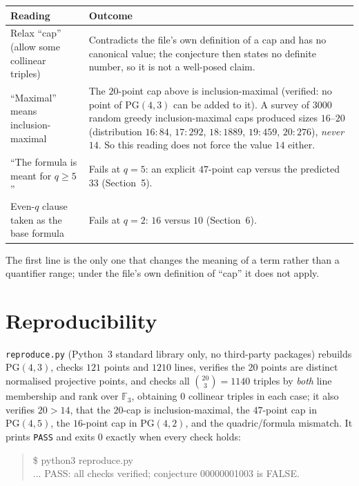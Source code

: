 \documentclass[11pt]{article}
\theoremstyle{definition}
\theoremstyle{remark}
\newcommand{\F}{\mathbb{F}}
\newcommand{\PG}{\mathrm{PG}}
\begin{document}
\begin{center}
\begin{tabular}{p{} p{}}
\toprule
Reading & Outcome \\
\midrule
Relax ``cap'' (allow some collinear triples) &
  Contradicts the file's own definition of a cap and has no canonical value;
  the conjecture then states no definite number, so it is not a well-posed
  claim. \\
``Maximal'' means inclusion-maximal &
  The $20$-point cap above is inclusion-maximal (verified: no point of
  $\PG(4,3)$ can be added to it). A survey of $3000$ random greedy
  inclusion-maximal caps produced sizes $16$--$20$ (distribution
  $16\!:\!84$, $17\!:\!292$, $18\!:\!1889$, $19\!:\!459$, $20\!:\!276$),
  \emph{never} $14$. So this reading does not force the value $14$ either. \\
``The formula is meant for $q\ge 5$'' &
  Fails at $q=5$: an explicit $47$-point cap versus the predicted $33$
  (Section~5). \\
Even-$q$ clause taken as the base formula &
  Fails at $q=2$: $16$ versus $10$ (Section~6). \\
\bottomrule
\end{tabular}
\end{center}

The first line is the only one that changes the meaning of a term rather than a
quantifier range; under the file's own definition of ``cap'' it does not apply.

\section{Reproducibility}

\texttt{reproduce.py} (Python~3 standard library only, no third-party packages)
rebuilds $\PG(4,3)$, checks $121$ points and $1210$ lines, verifies the
$20$ points are distinct normalised projective points, and checks all
$\binom{20}{3}=1140$ triples by \emph{both} line membership and rank over
$\F_{3}$, obtaining $0$ collinear triples in each case; it also verifies
$20>14$, that the $20$-cap is inclusion-maximal, the $47$-point cap in
$\PG(4,5)$, the $16$-point cap in $\PG(4,2)$, and the quadric/formula mismatch.
It prints \texttt{PASS} and exits $0$ exactly when every check holds:

\begin{quote}\ttfamily
\$ python3 reproduce.py\\
... PASS: all checks verified; conjecture 00000001003 is FALSE.
\end{quote}
\end{document}
